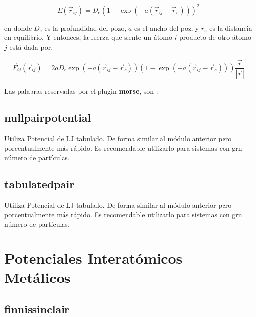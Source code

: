 $$E(\vec{r}_{ij}) = D_e\left(1-\exp(-a(\vec{r}_{ij}-\vec{r}_e))\right)^2$$

en donde $D_e$ es la profundidad del pozo, $a$ es el ancho del pozi y $r_e$ es la distancia en equilibrio. Y entonces, la fuerza que siente un \'atomo $i$ producto de otro \'atomo $j$ est\'a dada por,

$$\vec{F}_{ij} ( \vec{r}_{ij}) = 2aD_e\exp(-a(\vec{r}_{ij}-\vec{r}_e))\left(1-\exp(-a(\vec{r}_{ij}-\vec{r}_e))\right)\frac{\vec{r}}{|\vec{r}|}$$

Las palabras reservadas por el plugin \textbf{morse}, son :


\subsection{nullpairpotential}
Utiliza Potencial de LJ tabulado. De forma similar al m\'odulo anterior pero porcentualmente m\'as r\'apido. Es recomendable utilizarlo para sistemas con grn n\'umero de part\'iculas.

\subsection{tabulatedpair}
Utiliza Potencial de LJ tabulado. De forma similar al m\'odulo anterior pero porcentualmente m\'as r\'apido. Es recomendable utilizarlo para sistemas con grn n\'umero de part\'iculas.


\section{Potenciales Interat\'omicos Met\'alicos}

\subsection{finnissinclair}

